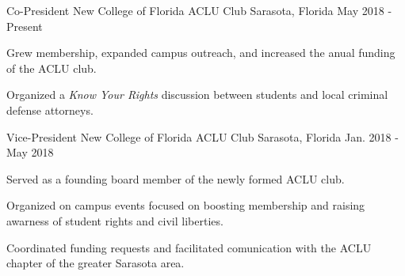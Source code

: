 

\begin{cventries}


  \cventry
    {Co-President} %
    {New College of Florida ACLU Club} %
    {Sarasota, Florida} %
    {May 2018 - Present} %
    {
      \begin{cvitems} %
        \item {Grew membership, expanded campus outreach, and increased the anual funding of the ACLU club.}
        \item {Organized a \emph{Know Your Rights} discussion between students and local criminal defense attorneys.}
      \end{cvitems}
    }

  \cventry
    {Vice-President} %
    {New College of Florida ACLU Club} %
    {Sarasota, Florida} %
    {Jan. 2018 - May 2018} %
    {
      \begin{cvitems} %
        \item {Served as a founding board member of the newly formed ACLU club.}
        \item {Organized on campus events focused on boosting membership and raising awarness of student rights and civil liberties.}
        \item {Coordinated funding requests and facilitated comunication with the ACLU chapter of the greater Sarasota area.}
      \end{cvitems}
    }
    
\end{cventries}
